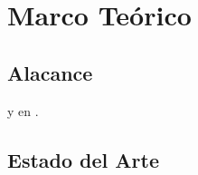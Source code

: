 \chapter{Marco Teórico}



\section{Alacance}

 \cite{listing_packagge} y en \cite{heinz1listings}.


 \section{Estado del Arte}